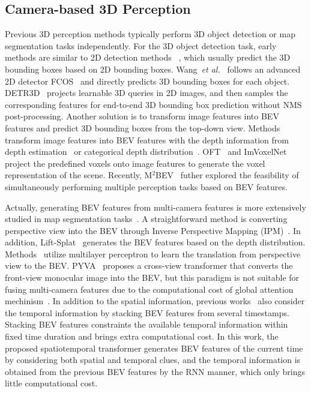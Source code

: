 \documentclass{article}
\newcommand{\etal}{\textit{et al.}}
\def\etal{{\em et al.~}}
\begin{document}
\subsection{Camera-based 3D Perception}
Previous 3D perception methods typically perform 3D object detection or map segmentation tasks independently.
For the 3D object detection task, early methods are similar to 2D detection methods ~\cite{brazil2019m3d,mousavian20173d,xu2018multi,Simonelli_2019_ICCV,zhou2019objects}, which usually predict the 3D bounding boxes based on 2D bounding boxes.
Wang~\etal\cite{wang2021fcos3d} follows an advanced 2D detector FCOS~\cite{tian2019fcos} and directly predicts 3D bounding boxes for each object. DETR3D~\cite{wang2022detr3d} projects learnable 3D queries in 2D images, and then samples the corresponding features for end-to-end 3D bounding box prediction without NMS post-processing. 
Another solution is to transform image features into BEV features and predict 3D bounding boxes from the top-down view.  Methods transform image features into BEV features with the depth information from  depth estimation~\cite{wang2019pseudo} or  categorical depth distribution~\cite{reading2021categorical}.
OFT~\cite{Roddick2019OrthographicFT} and ImVoxelNet~\cite{rukhovich2022imvoxelnet} project the predefined voxels onto image features to generate the voxel representation of the scene. Recently, M$^2$BEV~\cite{xie2022m} futher explored the feasibility of simultaneously performing multiple perception tasks based on BEV features.


Actually, generating BEV features from multi-camera features is more extensively studied in map segmentation tasks~\cite{philion2020lift,pan2020cross}. A straightforward method is converting perspective view into the BEV through Inverse Perspective Mapping (IPM)~\cite{reiher2020sim2real,can2021structured}. In addition, Lift-Splat~\cite{philion2020lift} generates the BEV features based on the depth distribution.
Methods~\cite{pan2020cross,hendy2020fishing,chitta2021neat} utilize multilayer perceptron to learn the translation from perspective view to the BEV.
PYVA~\cite{yang2021projecting} proposes a cross-view transformer that converts the front-view monocular image into the BEV, but this paradigm is not suitable for fusing multi-camera features due to the computational cost of global attention mechinism~\cite{vaswani2017attention}. In addition to the spatial information, previous works~\cite{hu2021fiery,saha2021translating,can2020understanding} also consider the temporal information  by stacking BEV features from several timestamps. Stacking BEV features constraints the available temporal information within fixed time duration and brings extra computational cost.
In this work, the proposed spatiotemporal transformer generates BEV features of the current time by considering both spatial and temporal clues, and the temporal information is obtained from the previous BEV features by the RNN manner, which only brings little computational cost.
\end{document}
